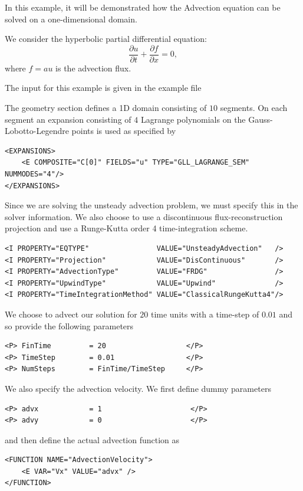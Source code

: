 In this example, it will be demonstrated how the Advection equation can be
solved on a one-dimensional domain.

We consider the hyperbolic partial differential equation:
\begin{equation}
\dfrac{\partial u}{\partial t} + \dfrac{\partial f}{\partial x} = 0,
\end{equation}
where $f =  a u$ is the advection flux.

The input for this example is given in the example file 

The geometry section defines a 1D domain consisting of $10$ segments. On each
segment an expansion consisting of $4$ Lagrange polynomials on the
Gauss-Lobotto-Legendre points is used as specified by
\begin{lstlisting}[style=XMLStyle]
<EXPANSIONS>
    <E COMPOSITE="C[0]" FIELDS="u" TYPE="GLL_LAGRANGE_SEM" NUMMODES="4"/>
</EXPANSIONS>
\end{lstlisting}

Since we are solving the unsteady advection problem, we must specify this in the
solver information. We also choose to use a discontinuous flux-reconstruction
projection and use a Runge-Kutta order 4 time-integration scheme.
\begin{lstlisting}[style=XMLStyle]
<I PROPERTY="EQTYPE"                VALUE="UnsteadyAdvection"   />
<I PROPERTY="Projection"            VALUE="DisContinuous"       />
<I PROPERTY="AdvectionType"         VALUE="FRDG"                />
<I PROPERTY="UpwindType"            VALUE="Upwind"              />
<I PROPERTY="TimeIntegrationMethod" VALUE="ClassicalRungeKutta4"/>
\end{lstlisting}

We choose to advect our solution for $20$ time units with a time-step of $0.01$
and so provide the following parameters
\begin{lstlisting}[style=XMLStyle]
<P> FinTime         = 20                   </P>
<P> TimeStep        = 0.01                 </P>
<P> NumSteps        = FinTime/TimeStep     </P>
\end{lstlisting}

We also specify the advection velocity. We first define dummy parameters
\begin{lstlisting}[style=XMLStyle]
<P> advx            = 1                     </P>
<P> advy            = 0                     </P>
\end{lstlisting}
and then define the actual advection function as
\begin{lstlisting}[style=XMLStyle]
<FUNCTION NAME="AdvectionVelocity">
    <E VAR="Vx" VALUE="advx" />
</FUNCTION>
\end{lstlisting}

